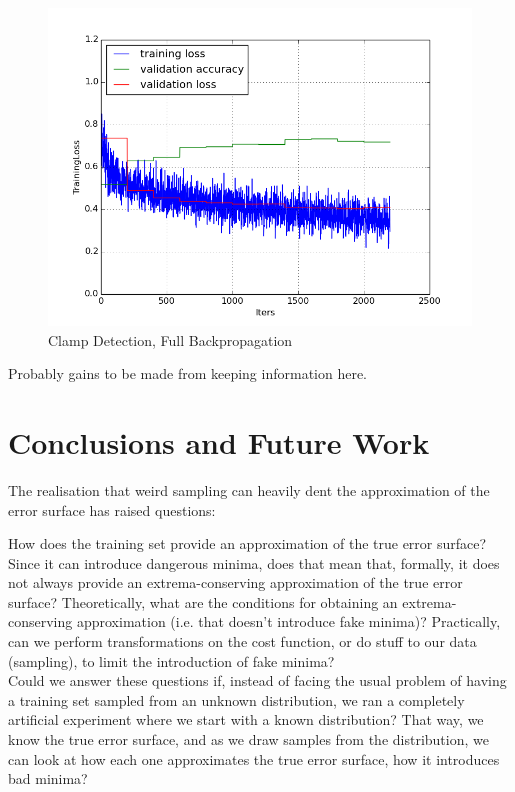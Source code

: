 \documentclass[a4paper,11pt]{article}
\begin{document}
\begin{figure}[h!]
	\centering
	\includegraphics[scale=0.5]{images/plot_hatch_markings_noneC.png}
	\caption{Clamp Detection, Full Backpropagation}
\end{figure}

Probably gains to be made from keeping information here. 

\clearpage
\section{Conclusions and Future Work}

The realisation that weird sampling can heavily dent the approximation of the error surface has raised questions:

How does the training set provide an approximation of the true error surface? Since it can introduce dangerous minima, does that mean that, formally, it does not always provide an extrema-conserving approximation of the true error surface? Theoretically, what are the conditions for obtaining an extrema-conserving approximation (i.e. that doesn't introduce fake minima)? Practically, can we perform transformations on the cost function, or do stuff to our data (sampling), to limit the introduction of fake minima?  \\

Could we answer these questions if, instead of facing the usual problem of having a training set sampled from an unknown distribution, we ran a completely artificial experiment where we start with a known distribution? That way, we know the true error surface, and as we draw samples from the distribution, we can look at how each one approximates the true error surface, how it introduces bad minima? \\
\end{document}
